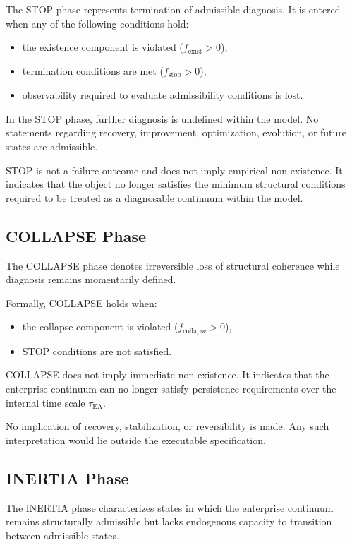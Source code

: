 The STOP phase represents termination of admissible diagnosis.
It is entered when any of the following conditions hold:
\begin{itemize}
  \item the existence component is violated ($f_{\text{exist}} > 0$),
  \item termination conditions are met ($f_{\text{stop}} > 0$),
  \item observability required to evaluate admissibility conditions is
        lost.
\end{itemize}

In the STOP phase, further diagnosis is undefined within the model.
No statements regarding recovery, improvement, optimization, evolution,
or future states are admissible.

STOP is not a failure outcome and does not imply empirical non-existence.
It indicates that the object no longer satisfies the minimum structural
conditions required to be treated as a diagnosable continuum within the
model.

\subsection{COLLAPSE Phase}

The COLLAPSE phase denotes irreversible loss of structural coherence
while diagnosis remains momentarily defined.

Formally, COLLAPSE holds when:
\begin{itemize}
  \item the collapse component is violated ($f_{\text{collapse}} > 0$),
  \item STOP conditions are not satisfied.
\end{itemize}

COLLAPSE does not imply immediate non-existence.
It indicates that the enterprise continuum can no longer satisfy
persistence requirements over the internal time scale
$\tau_{\mathrm{EA}}$.

No implication of recovery, stabilization, or reversibility is made.
Any such interpretation would lie outside the executable specification.

\subsection{INERTIA Phase}

The INERTIA phase characterizes states in which the enterprise continuum
remains structurally admissible but lacks endogenous capacity to
transition between admissible states.

